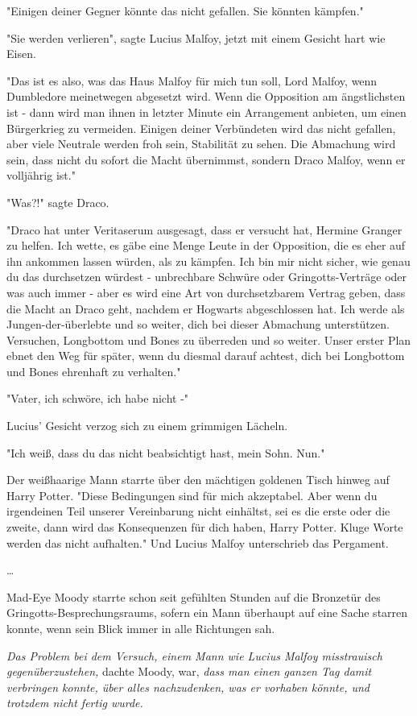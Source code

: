 {"Einigen deiner Gegner könnte das nicht gefallen. Sie könnten kämpfen."

"Sie werden verlieren", sagte Lucius Malfoy, jetzt mit einem Gesicht hart wie Eisen.

"Das ist es also, was das Haus Malfoy für mich tun soll, Lord Malfoy, wenn Dumbledore meinetwegen abgesetzt wird. Wenn die Opposition am ängstlichsten ist - dann wird man ihnen in letzter Minute ein Arrangement anbieten, um einen Bürgerkrieg zu vermeiden. Einigen deiner Verbündeten wird das nicht gefallen, aber viele Neutrale werden froh sein, Stabilität zu sehen. Die Abmachung wird sein, dass nicht du sofort die Macht übernimmst, sondern Draco Malfoy, wenn er volljährig ist."

"Was?!" sagte Draco.

"Draco hat unter Veritaserum ausgesagt, dass er versucht hat, Hermine Granger zu helfen. Ich wette, es gäbe eine Menge Leute in der Opposition, die es eher auf ihn ankommen lassen würden, als zu kämpfen. Ich bin mir nicht sicher, wie genau du das durchsetzen würdest - unbrechbare Schwüre oder Gringotts-Verträge oder was auch immer - aber es wird eine Art von durchsetzbarem Vertrag geben, dass die Macht an Draco geht, nachdem er Hogwarts abgeschlossen hat. Ich werde als Jungen-der-überlebte und so weiter, dich bei dieser Abmachung unterstützen. Versuchen, Longbottom und Bones zu überreden und so weiter. Unser erster Plan ebnet den Weg für später, wenn du diesmal darauf achtest, dich bei Longbottom und Bones ehrenhaft zu verhalten."

"Vater, ich schwöre, ich habe nicht -"

Lucius' Gesicht verzog sich zu einem grimmigen Lächeln.

"Ich weiß, dass du das nicht beabsichtigt hast, mein Sohn. Nun."

Der weißhaarige Mann starrte über den mächtigen goldenen Tisch hinweg auf Harry Potter. "Diese Bedingungen sind für mich akzeptabel. Aber wenn du irgendeinen Teil unserer Vereinbarung nicht einhältst, sei es die erste oder die zweite, dann wird das Konsequenzen für dich haben, Harry Potter. Kluge Worte werden das nicht aufhalten." Und Lucius Malfoy unterschrieb das Pergament.

…

Mad-Eye Moody starrte schon seit gefühlten Stunden auf die Bronzetür des Gringotts-Besprechungsraums, sofern ein Mann überhaupt auf eine Sache starren konnte, wenn sein Blick immer in alle Richtungen sah.

\emph{Das Problem bei dem Versuch, einem Mann wie Lucius Malfoy misstrauisch gegenüberzustehen,} dachte Moody, war, \emph{dass man einen ganzen Tag damit verbringen konnte, über alles nachzudenken, was er vorhaben könnte, und trotzdem nicht fertig wurde.}

}
